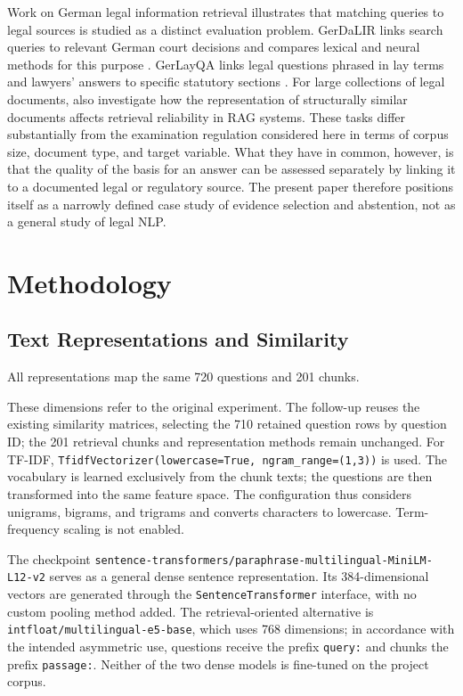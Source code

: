 \documentclass[11pt]{article}
\newcommand{\revision}[1]{#1}
\begin{document}
Work on German legal information retrieval illustrates that matching queries to legal sources is studied as a distinct evaluation problem. GerDaLIR links search queries to relevant German court decisions and compares lexical and neural methods for this purpose \citep{wrzalik-krechel-2021-gerdalir}. GerLayQA links legal questions phrased in lay terms and lawyers' answers to specific statutory sections \citep{buttner-habernal-2024-answering}. For large collections of legal documents, \citet{reuter-etal-2025-towards} also investigate how the representation of structurally similar documents affects retrieval reliability in RAG systems. These tasks differ substantially from the examination regulation considered here in terms of corpus size, document type, and target variable. What they have in common, however, is that the quality of the basis for an answer can be assessed separately by linking it to a documented legal or regulatory source. The present paper therefore positions itself as a narrowly defined case study of evidence selection and abstention, not as a general study of legal NLP.


\section{Methodology}

\subsection{Text Representations and Similarity}

All representations map the same 720 questions and 201 chunks.

\revision{These dimensions refer to the original experiment. The follow-up reuses the existing similarity matrices, selecting the 710 retained question rows by question ID; the 201 retrieval chunks and representation methods remain unchanged.} For TF-IDF, \texttt{TfidfVectorizer(lowercase=True, ngram\_range=(1,3))} is used. The vocabulary is learned exclusively from the chunk texts; the questions are then transformed into the same feature space. The configuration thus considers unigrams, bigrams, and trigrams and converts characters to lowercase. Term-frequency scaling is not enabled.

The checkpoint \nolinkurl{sentence-transformers/paraphrase-multilingual-MiniLM-L12-v2} serves as a general dense sentence representation. Its 384-dimensional vectors are generated through the \texttt{SentenceTransformer} interface, with no custom pooling method added. The retrieval-oriented alternative is \texttt{intfloat/multilingual-e5-base}, which uses 768 dimensions; in accordance with the intended asymmetric use, questions receive the prefix \texttt{query:} and chunks the prefix \texttt{passage:}. Neither of the two dense models is fine-tuned on the project corpus.
\end{document}
